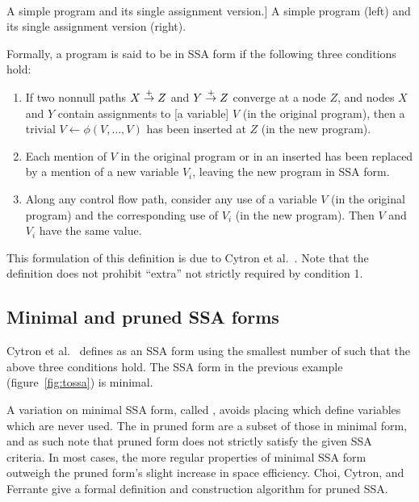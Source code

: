 \documentclass[12pt,titlepage,twoside]{article}
\begin{document}
\begin{myfigure}
\begin{center}
 \vline\ 
\end{center}
\caption
[A simple program and its single assignment version.]
{A simple program (left) and its single assignment version (right).
\label{fig:tossa}}
\end{myfigure}

Formally, a program is said to be in SSA form if the following three
conditions hold:
\begin{enumerate}
\item If two nonnull paths $X \stackrel{+}{\rightarrow} Z$ and $Y \stackrel{+}{\rightarrow} Z$
converge at a node $Z$, and nodes $X$ and $Y$ contain assignments to
[a variable] $V$ (in the original program), then a trivial
\phifunction{} $V \leftarrow \phi(V, \ldots, V)$ has been inserted at
$Z$ (in the new program).
\item Each mention of $V$ in the original program or in an inserted
\phifunction{} has been replaced by a mention of a new variable $V_i$,
leaving the new program in SSA form.
\item Along any control flow path, consider any use of a variable $V$
(in the original program) and the corresponding use of $V_i$ (in the
new program).  Then $V$ and $V_i$ have the same value.
\end{enumerate}
This formulation of this definition is due to Cytron et al.\ 
\cite{cytron91:ssa}.  Note that the definition does not prohibit
``extra'' \phifunction{s} not strictly required by condition 1.

\subsection{Minimal and pruned SSA forms}
Cytron et al.\ \cite{cytron91:ssa} defines  as
an SSA form using the smallest number of  such that the
above three conditions hold.  
The SSA form in the previous example (figure~\vref{fig:tossa}) is minimal.

A variation
on minimal SSA form, called ,
avoids placing  which define variables which are never used.
The \phifunction{s} in pruned form are a subset of those in minimal
form, and as such note that pruned form does not strictly satisfy the
given SSA criteria.
In most cases, the more regular properties of minimal SSA form
outweigh the pruned form's slight increase in space efficiency.
Choi, Cytron, and Ferrante \cite{ferrante91:pruned} give a formal
definition and construction algorithm for pruned SSA.
\end{document}
